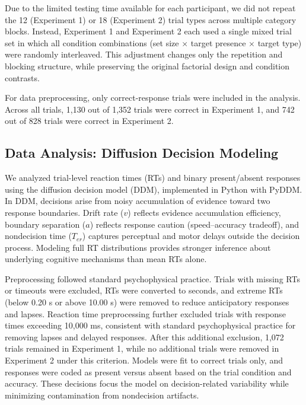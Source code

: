\documentclass[stu,12pt,floatsintext]{apa7}
\begin{document}
Due to the limited testing time available for each participant, we did not repeat the 12 (Experiment 1) or 18 (Experiment 2) trial types across multiple category blocks. Instead, Experiment 1 and Experiment 2 each used a single mixed trial set in which all condition combinations (set size $\times$ target presence $\times$ target type) were randomly interleaved. This adjustment changes only the repetition and blocking structure, while preserving the original factorial design and condition contrasts.

For data preprocessing, only correct-response trials were included in the analysis. Across all trials, 1,130 out of 1,352 trials were correct in Experiment 1, and 742 out of 828 trials were correct in Experiment 2. 

\subsection{Data Analysis: Diffusion Decision Modeling}

We analyzed trial-level reaction times (RTs) and binary present/absent responses using the diffusion decision model (DDM), implemented in Python with PyDDM. In DDM, decisions arise from noisy accumulation of evidence toward two response boundaries. Drift rate ($v$) reflects evidence accumulation efficiency, boundary separation ($a$) reflects response caution (speed--accuracy tradeoff), and nondecision time ($T_{er}$) captures perceptual and motor delays outside the decision process. Modeling full RT distributions provides stronger inference about underlying cognitive mechanisms than mean RTs alone.

Preprocessing followed standard psychophysical practice. Trials with missing RTs or timeouts were excluded, RTs were converted to seconds, and extreme RTs (below 0.20 s or above 10.00 s) were removed to reduce anticipatory responses and lapses. Reaction time preprocessing further excluded trials with response times exceeding 10,000 ms, consistent with standard psychophysical practice for removing lapses and delayed responses. After this additional exclusion, 1,072 trials remained in Experiment 1, while no additional trials were removed in Experiment 2 under this criterion. Models were fit to correct trials only, and responses were coded as present versus absent based on the trial condition and accuracy. These decisions focus the model on decision-related variability while minimizing contamination from nondecision artifacts.
\end{document}
